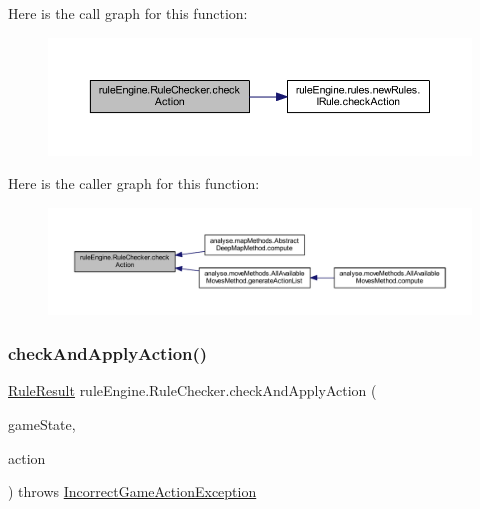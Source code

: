Here is the call graph for this function\+:
\nopagebreak
\begin{figure}[H]
\begin{center}
\leavevmode
\includegraphics[width=350pt]{classrule_engine_1_1_rule_checker_a8d948e5ff32b545244d251c57a59c117_cgraph}
\end{center}
\end{figure}
Here is the caller graph for this function\+:
\nopagebreak
\begin{figure}[H]
\begin{center}
\leavevmode
\includegraphics[width=350pt]{classrule_engine_1_1_rule_checker_a8d948e5ff32b545244d251c57a59c117_icgraph}
\end{center}
\end{figure}
\mbox{\label{classrule_engine_1_1_rule_checker_a864194ca6149949900274c5b369abfc2}} 
\subsubsection{\texorpdfstring{check\+And\+Apply\+Action()}{checkAndApplyAction()}}
{\footnotesize\ttfamily \mbox{\hyperlink{classrule_engine_1_1_rule_result}{Rule\+Result}} rule\+Engine.\+Rule\+Checker.\+check\+And\+Apply\+Action (\begin{DoxyParamCaption}\item[{\mbox{\hyperlink{classgame_1_1game_state_1_1_game_state}{Game\+State}}}]{game\+State,  }\item[{\mbox{\hyperlink{classrule_engine_1_1_game_action}{Game\+Action}}}]{action }\end{DoxyParamCaption}) throws \mbox{\hyperlink{classrule_engine_1_1exceptions_1_1_incorrect_game_action_exception}{Incorrect\+Game\+Action\+Exception}}\hspace{0.3cm}{\ttfamily [inline]}}

